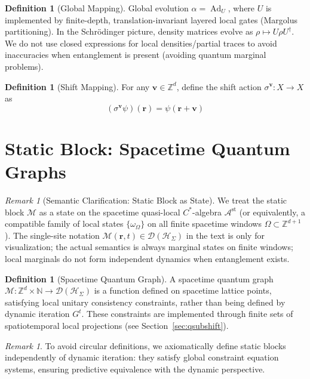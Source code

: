 \documentclass[11pt]{article}
\theoremstyle{definition}
\newtheorem{definition}[theorem]{Definition}
\theoremstyle{remark}
\newtheorem{remark}[theorem]{Remark}
\DeclareMathOperator{\Ad}{Ad}
\begin{document}
\begin{definition}[Global Mapping]\label{def:qglobal}
Global evolution \( \alpha = \Ad_U \), where \( U \) is implemented by finite-depth, translation-invariant layered local gates (Margolus partitioning). In the Schrödinger picture, density matrices evolve as \( \rho \mapsto U \rho U^\dagger \). We do not use closed expressions for local densities/partial traces to avoid inaccuracies when entanglement is present (avoiding quantum marginal problems).
\end{definition}

\begin{definition}[Shift Mapping]\label{def:qshift}
For any \( \mathbf{v} \in \mathbb{Z}^d \), define the shift action \( \sigma^\mathbf{v}: X \to X \) as
\[
(\sigma^\mathbf{v} \psi)(\mathbf{r}) = \psi(\mathbf{r} + \mathbf{v})
\]
\end{definition}

\section{Static Block: Spacetime Quantum Graphs}\label{sec:static}

\begin{remark}[Semantic Clarification: Static Block as State]\label{rem:3.1}
We treat the static block \( \mathcal{M} \) as a state on the spacetime quasi-local \( C^* \)-algebra \( \mathcal{A}^{\mathrm{st}} \) (or equivalently, a compatible family of local states \( \{\omega_\Omega\} \) on all finite spacetime windows \( \Omega\subset\mathbb{Z}^{d+1} \)). The single-site notation \( \mathcal{M}(\mathbf{r},t)\in\mathcal{D}(\mathcal{H}_\Sigma) \) in the text is only for visualization; the actual semantics is always marginal states on finite windows; local marginals do not form independent dynamics when entanglement exists.
\end{remark}

\begin{definition}[Spacetime Quantum Graph]\label{def:qspacetime}
A spacetime quantum graph \( \mathcal{M}: \mathbb{Z}^d \times \mathbb{N} \to \mathcal{D}(\mathcal{H}_\Sigma) \) is a function defined on spacetime lattice points, satisfying local unitary consistency constraints, rather than being defined by dynamic iteration \( G^t \). These constraints are implemented through finite sets of spatiotemporal local projections (see Section~\ref{sec:qsubshift}).
\end{definition}

\begin{remark}\label{rem:3.2}
To avoid circular definitions, we axiomatically define static blocks independently of dynamic iteration: they satisfy global constraint equation systems, ensuring predictive equivalence with the dynamic perspective.
\end{remark}
\end{document}
